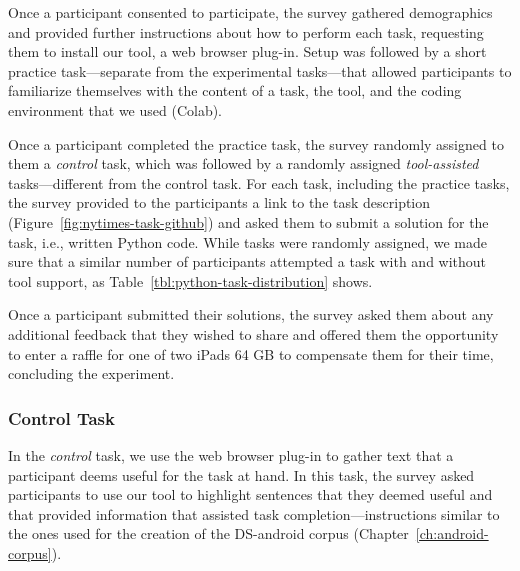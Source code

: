 Once a participant consented to participate, the survey gathered demographics and provided further instructions 
about how to perform each task, requesting them to install our tool, a web browser plug-in.
Setup was followed by a short practice task---separate from the experimental tasks---that allowed participants to familiarize themselves with the content of a task, the tool, and the coding environment that we used (Colab). 


Once a participant completed the practice task, the survey randomly assigned to them a \textit{control} task, which was followed by a randomly assigned \textit{tool-assisted} tasks---different from the control task.
For each task, including the practice tasks, the survey provided to the participants a link 
to the task description (Figure~\ref{fig:nytimes-task-github}) and asked them to submit a solution for the task, i.e., written Python code. While tasks were randomly assigned, we made sure that a similar number of participants attempted a task with and without tool support, as Table~\ref{tbl:python-task-distribution} shows.


Once a participant submitted their solutions, the survey
asked them about any additional feedback that they wished to share and 
offered them the opportunity to enter a raffle for one of two iPads 64 GB 
to compensate them for their time, concluding the experiment.







\subsubsection{Control Task}
\label{cp6:procedures-manual}


In the \textit{control} task, we use the web browser plug-in to gather text that a participant deems useful for the task at hand. In this task, 
the survey asked participants to use our tool to highlight sentences that they deemed useful and that provided information that assisted task completion---instructions similar to the ones used for the creation of the \acs{DS-android} corpus (Chapter~\ref{ch:android-corpus}). 




